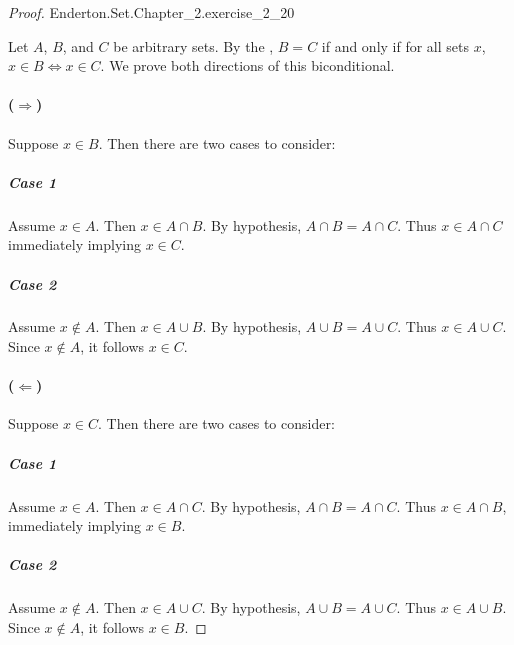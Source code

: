 \documentclass{report}
\begin{document}
\begin{proof}

    {Enderton.Set.Chapter\_2.exercise\_2\_20}

  Let $A$, $B$, and $C$ be arbitrary sets.
  By the , $B = C$ if and only if for all sets
    $x$, $x \in B \iff x \in C$.
  We prove both directions of this biconditional.

  \paragraph{($\Rightarrow$)}%

    Suppose $x \in B$.
    Then there are two cases to consider:

    \subparagraph{Case 1}%

      Assume $x \in A$.
      Then $x \in A \cap B$.
      By hypothesis, $A \cap B = A \cap C$.
      Thus $x \in A \cap C$ immediately implying $x \in C$.

    \subparagraph{Case 2}%

      Assume $x \not\in A$.
      Then $x \in A \cup B$.
      By hypothesis, $A \cup B = A \cup C$.
      Thus $x \in A \cup C$.
      Since $x \not\in A$, it follows $x \in C$.

  \paragraph{($\Leftarrow$)}%

    Suppose $x \in C$.
    Then there are two cases to consider:

    \subparagraph{Case 1}%

      Assume $x \in A$.
      Then $x \in A \cap C$.
      By hypothesis, $A \cap B = A \cap C$.
      Thus $x \in A \cap B$, immediately implying $x \in B$.

    \subparagraph{Case 2}%

      Assume $x \not\in A$.
      Then $x \in A \cup C$.
      By hypothesis, $A \cup B = A \cup C$.
      Thus $x \in A \cup B$.
      Since $x \not\in A$, it follows $x \in B$.

\end{proof}

\subsection{}%
\end{document}
